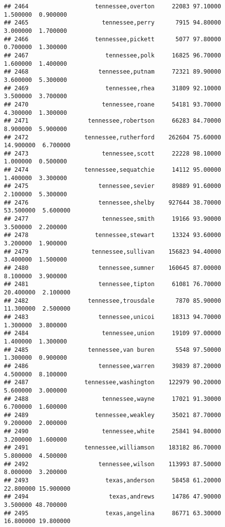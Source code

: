 \documentclass[
]{article}
\begin{document}
\begin{verbatim}
## 2464                   tennessee,overton     22083 97.10000  1.500000  0.900000
## 2465                     tennessee,perry      7915 94.80000  3.000000  1.700000
## 2466                   tennessee,pickett      5077 97.80000  0.700000  1.300000
## 2467                      tennessee,polk     16825 96.70000  1.600000  1.400000
## 2468                    tennessee,putnam     72321 89.90000  3.600000  5.300000
## 2469                      tennessee,rhea     31809 92.10000  3.500000  3.700000
## 2470                     tennessee,roane     54181 93.70000  4.300000  1.300000
## 2471                 tennessee,robertson     66283 84.70000  8.900000  5.900000
## 2472                tennessee,rutherford    262604 75.60000 14.900000  6.700000
## 2473                     tennessee,scott     22228 98.10000  1.000000  0.500000
## 2474                tennessee,sequatchie     14112 95.00000  1.400000  3.300000
## 2475                    tennessee,sevier     89889 91.60000  2.100000  5.300000
## 2476                    tennessee,shelby    927644 38.70000 53.500000  5.600000
## 2477                     tennessee,smith     19166 93.90000  3.500000  2.200000
## 2478                   tennessee,stewart     13324 93.60000  3.200000  1.900000
## 2479                  tennessee,sullivan    156823 94.40000  3.400000  1.500000
## 2480                    tennessee,sumner    160645 87.00000  8.100000  3.900000
## 2481                    tennessee,tipton     61081 76.70000 20.400000  2.100000
## 2482                 tennessee,trousdale      7870 85.90000 11.300000  2.500000
## 2483                    tennessee,unicoi     18313 94.70000  1.300000  3.800000
## 2484                     tennessee,union     19109 97.00000  1.400000  1.300000
## 2485                 tennessee,van buren      5548 97.50000  1.300000  0.900000
## 2486                    tennessee,warren     39839 87.20000  4.500000  8.100000
## 2487                tennessee,washington    122979 90.20000  5.600000  3.000000
## 2488                     tennessee,wayne     17021 91.30000  6.700000  1.600000
## 2489                   tennessee,weakley     35021 87.70000  9.200000  2.000000
## 2490                     tennessee,white     25841 94.80000  3.200000  1.600000
## 2491                tennessee,williamson    183182 86.70000  5.800000  4.500000
## 2492                    tennessee,wilson    113993 87.50000  8.000000  3.200000
## 2493                      texas,anderson     58458 61.20000 22.800000 15.900000
## 2494                       texas,andrews     14786 47.90000  3.500000 48.700000
## 2495                      texas,angelina     86771 63.30000 16.800000 19.800000

\end{verbatim}
\end{document}
